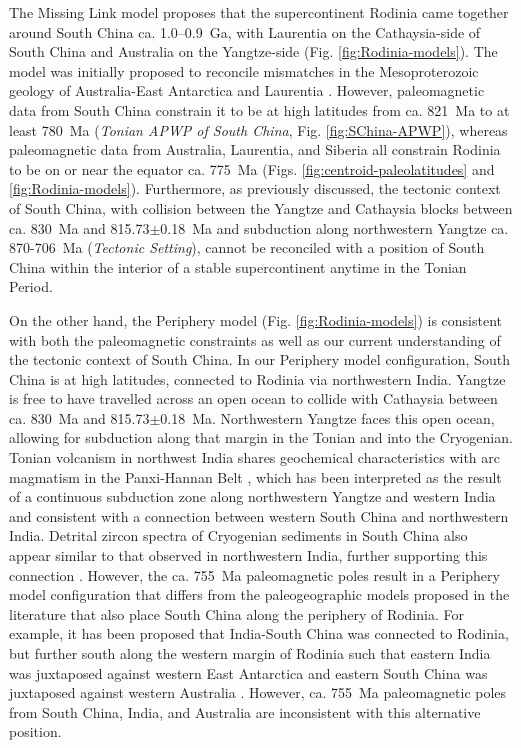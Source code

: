 The Missing Link model proposes that the supercontinent Rodinia came together around South China ca. 1.0--0.9~Ga, with Laurentia on the Cathaysia-side of South China and Australia on the Yangtze-side (Fig. \ref{fig:Rodinia-models}). The model was initially proposed to reconcile mismatches in the Mesoproterozoic geology of Australia-East Antarctica and Laurentia \citep{Li1995a}. However, paleomagnetic data from South China constrain it to be at high latitudes from ca. 821~Ma to at least 780~Ma (\textit{Tonian APWP of South China}, Fig. \ref{fig:SChina-APWP}), whereas paleomagnetic data from Australia, Laurentia, and Siberia all constrain Rodinia to be on or near the equator ca. 775~Ma (Figs. \ref{fig:centroid-paleolatitudes} and \ref{fig:Rodinia-models}). Furthermore, as previously discussed, the tectonic context of South China, with collision between the Yangtze and Cathaysia blocks between ca. 830~Ma and 815.73$\pm$0.18~Ma and subduction along northwestern Yangtze ca. 870-706~Ma (\textit{Tectonic Setting}), cannot be reconciled with a position of South China within the interior of a stable supercontinent anytime in the Tonian Period.

On the other hand, the Periphery model (Fig. \ref{fig:Rodinia-models}) is consistent with both the paleomagnetic constraints as well as our current understanding of the tectonic context of South China. In our Periphery model configuration, South China is at high latitudes, connected to Rodinia via northwestern India. Yangtze is free to have travelled across an open ocean to collide with Cathaysia between ca. 830~Ma and 815.73$\pm$0.18~Ma. Northwestern Yangtze faces this open ocean, allowing for subduction along that margin in the Tonian and into the Cryogenian. Tonian volcanism in northwest India shares geochemical characteristics with arc magmatism in the Panxi-Hannan Belt \citep{Ashwal2013a, Cawood2017a}, which has been interpreted as the result of a continuous subduction zone along northwestern Yangtze and western India and consistent with a connection between western South China and northwestern India. Detrital zircon spectra of Cryogenian sediments in South China also appear similar to that observed in northwestern India, further supporting this connection \citep{Cawood2017a, Qi2020a}. However, the ca. 755~Ma paleomagnetic poles result in a Periphery model configuration that differs from the paleogeographic models proposed in the literature that also place South China along the periphery of Rodinia. For example, it has been proposed that India-South China was connected to Rodinia, but further south along the western margin of Rodinia such that eastern India was juxtaposed against western East Antarctica and eastern South China was juxtaposed against western Australia \citep{Cawood2017a}. However, ca. 755~Ma paleomagnetic poles from South China, India, and Australia are inconsistent with this alternative position.

